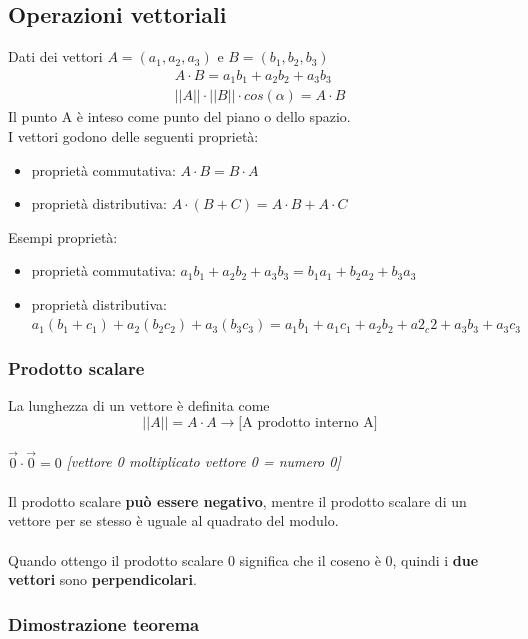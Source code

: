 \documentclass[italian]{article}
\begin{document}
\subsection{Operazioni vettoriali}
Dati dei vettori $A=(a_1, a_2, a_3)$ e $B=(b_1, b_2, b_3)$
\begin{gather*}
	A\cdot B = a_1b_1 + a_2b_2 + a_3b_3\\
	||A||\cdot ||B|| \cdot cos(\alpha) = A\cdot B
\end{gather*}
Il punto A è inteso come punto del piano o dello spazio.\\
I vettori godono delle seguenti proprietà:
\begin{itemize}
	\item proprietà commutativa:  $A\cdot B = B\cdot A$
	\item proprietà distributiva: $A\cdot (B+C) = A\cdot B + A \cdot C$
\end{itemize}
Esempi proprietà:
\begin{itemize}
	\item proprietà commutativa:  $a_1b_1 + a_2b_2 + a_3b_3 = b_1a_1 + b_2a_2 + b_3a_3$
	\item proprietà distributiva: $a_1(b_1+c_1)+a_2(b_2c_2) + a_3(b_3c_3) = a_1b_1 + a_1c_1 + a_2b_2 + a2_c2+a_3b_3+a_3c_3$
\end{itemize}
\subsubsection{Prodotto scalare}

La lunghezza di un vettore è definita come
\[
	||A|| = A\cdot A \to \text{[A prodotto interno A]}
\]\\
$\vec{0}\cdot \vec{0} = 0$ \qquad \textit{[vettore 0 moltiplicato vettore 0 = numero 0]}\\\\
Il prodotto scalare \textbf{può essere negativo}, mentre il prodotto scalare di un vettore per se stesso è uguale al quadrato del modulo.\\\\
Quando ottengo il prodotto scalare 0 significa che il coseno è 0, quindi i \textbf{due vettori} sono \textbf{perpendicolari}.

\subsubsection{Dimostrazione teorema}
\end{document}
